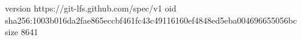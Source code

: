version https://git-lfs.github.com/spec/v1
oid sha256:1003b016da2fae865eccbf461fc43c49116160ef4848ed5eba004696655056bc
size 8641
